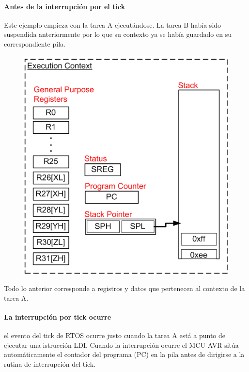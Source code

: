 \paragraph{Antes de la interrupción por el tick}

Este ejemplo empieza con la tarea A ejecutándose. La tarea B había sido suspendida anteriormente por lo que su contexto ya se había guardado en su correspondiente pila.


\begin{figure}[H]
    \centering
    \includegraphics[scale=0.7]{RTOS/f5.png}
\end{figure}

Todo lo anterior corresponde a registros y datos que pertenecen al contexto de la tarea A.

\paragraph{La interrupción por tick ocurre}

el evento del tick de RTOS ocurre justo cuando la tarea A está a punto de ejecutar una istrucción LDI. Cuando la interrupción ocurre el MCU AVR sitúa automáticamente el contador del programa (PC) en la pila antes de dirigirse a la rutina de interrupción del tick.

